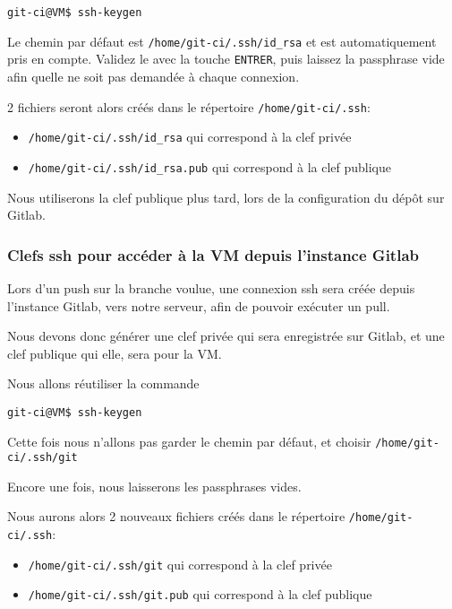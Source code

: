     \begin{verbatim}
git-ci@VM$ ssh-keygen    
    \end{verbatim}

Le chemin par défaut est \texttt{/home/git-ci/.ssh/id\_rsa} et est automatiquement pris en compte. Validez le avec la touche \texttt{ENTRER}, puis laissez la passphrase vide afin quelle ne soit pas demandée à chaque connexion.

2 fichiers seront alors créés dans le répertoire \texttt{/home/git-ci/.ssh}:

    \begin{itemize}
         \item \texttt{/home/git-ci/.ssh/id\_rsa} qui correspond à la clef privée\\
         \item \texttt{/home/git-ci/.ssh/id\_rsa.pub} qui correspond à la clef publique\\
    \end{itemize}

Nous utiliserons la clef publique plus tard, lors de la configuration du dépôt sur Gitlab.


\subsubsection{Clefs ssh pour accéder à la VM depuis l'instance Gitlab}
Lors d'un push sur la branche voulue, une connexion ssh sera créée depuis l'instance Gitlab, vers notre serveur, afin de pouvoir exécuter un pull.

Nous devons donc générer une clef privée qui sera enregistrée sur Gitlab, et une clef publique qui elle, sera pour la VM.

Nous allons réutiliser la commande 
    \begin{verbatim}
git-ci@VM$ ssh-keygen    
    \end{verbatim}

Cette fois nous n'allons pas garder le chemin par défaut, et choisir \texttt{/home/git-ci/.ssh/git}

Encore une fois, nous laisserons les passphrases vides.

Nous aurons alors 2 nouveaux fichiers créés dans le répertoire \texttt{/home/git-ci/.ssh}:

    \begin{itemize}
         \item \texttt{/home/git-ci/.ssh/git} qui correspond à la clef privée\\
         \item \texttt{/home/git-ci/.ssh/git.pub} qui correspond à la clef publique\\
    \end{itemize}

